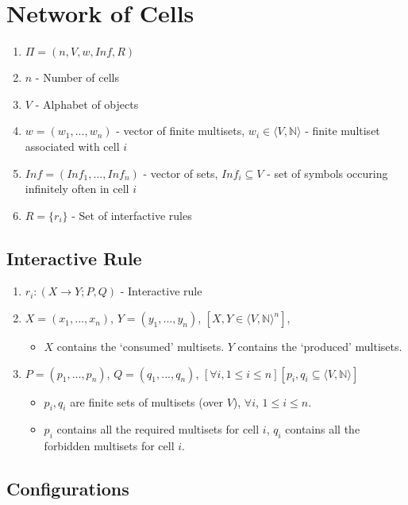 \documentclass{article}
\newcommand{\la}{\langle}
\newcommand{\ra}{\rangle}
\begin{document}
\section{Network of Cells}

\begin{enumerate}
   \item $\Pi = (n, V, w, Inf, R)$
   \item $n$ - Number of cells
   \item $V$ - Alphabet of objects
   \item $w = (w_1,...,w_n)$ - vector of finite multisets, $w_i \in \la V, \mathbb{N}\ra$ - 
         finite multiset associated with cell $i$
   \item $Inf = (Inf_1,...,Inf_n)$ - vector of sets, $Inf_i \subseteq V$ - set of symbols occuring 
         infinitely often in cell $i$
   \item $R = \{r_i\}$ - Set of interfactive rules
\end{enumerate}

\subsection{Interactive Rule}

\begin{enumerate}
   \item $r_i: (X \rightarrow Y; P, Q)$ - Interactive rule
   \item $X = (x_1,...,x_n)$, $Y = (y_1,...,y_n)$, $[X,Y \in \la V,\mathbb{N}\ra^n]$, 
         \begin{itemize}
         \item $X$ contains the `consumed' multisets. $Y$ contains the `produced' multisets.
         \end{itemize}
   \item $P = (p_1,...,p_n)$, $Q = (q_1,...,q_n)$, $[\forall i, 1\leq i\leq n]
         [p_i,q_i \subseteq \la V, \mathbb{N} \ra]$ 
         \begin{itemize}
         \item $p_i, q_i$ are  finite sets of multisets (over $V$), $\forall i$, $1 \leq i \leq n$.
         \item $p_i$ contains all the required multisets for cell $i$, $q_i$ contains all the 
               forbidden multisets for cell $i$. 
         \end{itemize}
\end{enumerate}

\subsection{Configurations}
\end{document}
